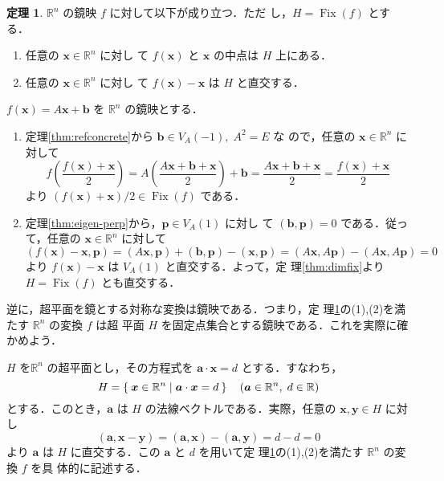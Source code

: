 \documentclass[11pt, uplatex, dvipdfmx, titlepage]{jsarticle}
\makeatletter
\DeclareMathOperator{\Fix}{Fix}
\renewenvironment{proof}[1][\proofname]{\par
  \pushQED{\qed}%
  \normalfont \topsep6\p@\@plus6\p@\relax
  \trivlist
  \item[\hskip\labelsep
         \bfseries
    {#1}]\ignorespaces
}{%
  \popQED\endtrivlist\@endpefalse
}
\theoremstyle{definition}
\newtheorem{theorem}{定理}[section]
\renewcommand{\proofname}{\textbf{証明}}
\makeatother
\begin{document}
\begin{theorem}\label{thm:ref_is_sym}
  $\mathbb{R}^n$ の鏡映 $f$ に対して以下が成り立つ．ただ
  し，$H=\Fix(f)$ とする．
  \begin{enumerate}[(1)]
  \item 任意の $\bm{x} \in \mathbb{R}^n$ に対し
    て $f(\bm{x})$ と $\bm{x}$ の中点は $H$ 上にある．
    
  \item 任意の $\bm{x} \in \mathbb{R}^n$ に対し
    て $f(\bm{x})-\bm{x}$ は $H$ と直交する．
  \end{enumerate}  
\end{theorem}

\begin{proof}
  $f(\bm{x}) = A\bm{x}+\bm{b}$ を $\mathbb{R}^n$ の鏡映とする．
  \begin{enumerate}[(1)]
  \item 定理\ref{thm:refconcrete}から $\bm{b} \in V_A(-1), \; A^2=E$ な
    ので，任意の $\bm{x} \in \mathbb{R}^n$ に対して
    \[
      f\left( \frac{f(\bm{x}) + \bm{x}}{2}\right) =
      A\left(\frac{A\bm{x}+\bm{b}+\bm{x}}{2}\right)+\bm{b}
      =\frac{A\bm{x} + \bm{b} + \bm{x}}{2} = \frac{f(\bm{x})+\bm{x}}{2}
    \]
    より $\left(f(\bm{x})+\bm{x}\right)/2 \in \Fix(f)$ である．
    
  \item 定理\ref{thm:eigen-perp}から，$\bm{p} \in V_A(1)$ に対し
    て $(\bm{b}, \bm{p})=0$ である．従って，任意の $\bm{x} \in
    \mathbb{R}^n$ に対して
    \[
      \left(f(\bm{x})-\bm{x}, \bm{p}\right)  =(A\bm{x},\bm{p})+(\bm{b},\bm{p}) - (\bm{x},\bm{p})
      =(A\bm{x}, A\bm{p}) - (A\bm{x}, A\bm{p}) = 0
    \]
    より $f(\bm{x})-\bm{x}$ は $V_A(1)$ と直交する．よって，定
    理\ref{thm:dimfix}より $H=\Fix(f)$ とも直交する．
  \end{enumerate}
\end{proof}

逆に，超平面を鏡とする対称な変換は鏡映である．つまり，定
理\ref{thm:ref_is_sym}の(1),(2)を満たす $\mathbb{R}^n$ の変換 $f$ は超
平面 $H$ を固定点集合とする鏡映である．これを実際に確かめよう．

$H$ を$\mathbb{R}^n$ の超平面とし，その方程式を $\bm{a} \cdot  \bm{x}=d$ とする．すなわち，
\[
  H = \Set{ \bm{x} \in \mathbb{R}^n | \bm{a} \cdot \bm{x} = d} \quad
  (\bm{a} \in \mathbb{R}^n, \; d \in \mathbb{R})
\]
とする．このとき，$\bm{a}$ は $H$ の法線ベクトルである．実際，任意の $\bm{x}, \bm{y} \in H$ に対し
\[
  (\bm{a}, \bm{x}-\bm{y}) = (\bm{a}, \bm{x}) - (\bm{a}, \bm{y}) = d-d=0
\]
より $\bm{a}$ は $H$ に直交する．この $\bm{a}$ と $d$ を用いて定
理\ref{thm:ref_is_sym}の(1),(2)を満たす $\mathbb{R}^n$ の変換 $f$ を具
体的に記述する．
\end{document}

